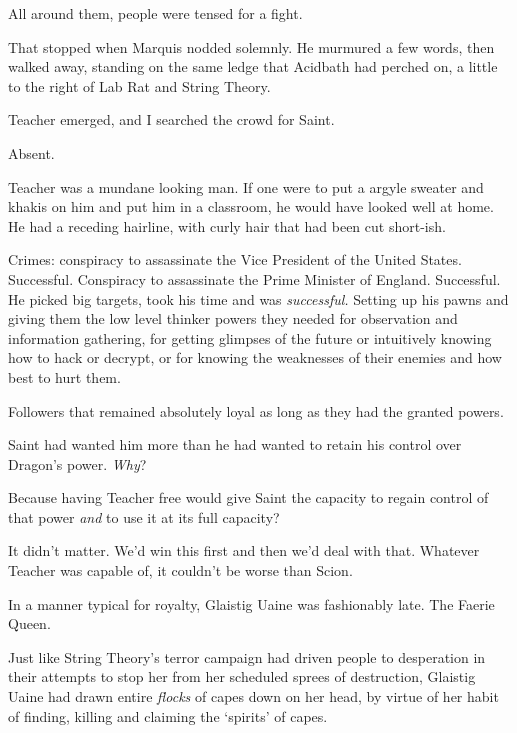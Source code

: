 All around them, people were tensed for a fight.



That stopped when Marquis nodded solemnly.  He murmured a few words, then walked away, standing on the same ledge that Acidbath had perched on, a little to the right of Lab Rat and String Theory.



Teacher emerged, and I searched the crowd for Saint.



Absent.



Teacher was a mundane looking man.  If one were to put a argyle sweater and khakis on him and put him in a classroom, he would have looked well at home.  He had a receding hairline, with curly hair that had been cut short-ish.



Crimes: conspiracy to assassinate the Vice President of the United States.  Successful.  Conspiracy to assassinate the Prime Minister of England.  Successful.  He picked big targets, took his time and was \emph{successful.}  Setting up his pawns and giving them the low level thinker powers they needed for observation and information gathering, for getting glimpses of the future or intuitively knowing how to hack or decrypt, or for knowing the weaknesses of their enemies and how best to hurt them.



Followers that remained absolutely loyal as long as they had the granted powers.



Saint had wanted him more than he had wanted to retain his control over Dragon's power.  \emph{Why}?



Because having Teacher free would give Saint the capacity to regain control of that power \emph{and }to use it at its full capacity?



It didn't matter.  We'd win this first and then we'd deal with that.  Whatever Teacher was capable of, it couldn't be worse than Scion.



In a manner typical for royalty, Glaistig Uaine was fashionably late.  The Faerie Queen.



Just like String Theory's terror campaign had driven people to desperation in their attempts to stop her from her scheduled sprees of destruction, Glaistig Uaine had drawn entire \emph{flocks} of capes down on her head, by virtue of her habit of finding, killing and claiming the `spirits' of capes.



